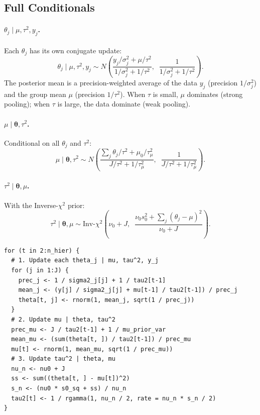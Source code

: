 \documentclass[11pt]{article}
\begin{document}
\subsection{Full Conditionals}

\paragraph{$\theta_j \mid \mu, \tau^2, y_j$.}
Each $\theta_j$ has its own conjugate update:
\[
  \theta_j \mid \mu, \tau^2, y_j \sim N\!\left(\frac{y_j/\sigma_j^2 + \mu/\tau^2}{1/\sigma_j^2 + 1/\tau^2}, \;\; \frac{1}{1/\sigma_j^2 + 1/\tau^2}\right).
\]
The posterior mean is a precision-weighted average of the data $y_j$ (precision $1/\sigma_j^2$) and the group mean $\mu$ (precision $1/\tau^2$).  When $\tau$ is small, $\mu$ dominates (strong pooling); when $\tau$ is large, the data dominate (weak pooling).

\paragraph{$\mu \mid \boldsymbol{\theta}, \tau^2$.}
Conditional on all $\theta_j$ and $\tau^2$:
\[
  \mu \mid \boldsymbol{\theta}, \tau^2 \sim N\!\left(\frac{\sum_j \theta_j / \tau^2 + \mu_0/\tau_{\mu}^2}{J/\tau^2 + 1/\tau_{\mu}^2}, \;\; \frac{1}{J/\tau^2 + 1/\tau_{\mu}^2}\right).
\]

\paragraph{$\tau^2 \mid \boldsymbol{\theta}, \mu$.}
With the Inverse-$\chi^2$ prior:
\[
  \tau^2 \mid \boldsymbol{\theta}, \mu \sim \text{Inv-}\chi^2\!\left(\nu_0 + J, \;\; \frac{\nu_0 s_0^2 + \sum_j (\theta_j - \mu)^2}{\nu_0 + J}\right).
\]

\begin{lstlisting}
for (t in 2:n_hier) {
  # 1. Update each theta_j | mu, tau^2, y_j
  for (j in 1:J) {
    prec_j <- 1 / sigma2_j[j] + 1 / tau2[t-1]
    mean_j <- (y[j] / sigma2_j[j] + mu[t-1] / tau2[t-1]) / prec_j
    theta[t, j] <- rnorm(1, mean_j, sqrt(1 / prec_j))
  }
  # 2. Update mu | theta, tau^2
  prec_mu <- J / tau2[t-1] + 1 / mu_prior_var
  mean_mu <- (sum(theta[t, ]) / tau2[t-1]) / prec_mu
  mu[t] <- rnorm(1, mean_mu, sqrt(1 / prec_mu))
  # 3. Update tau^2 | theta, mu
  nu_n <- nu0 + J
  ss <- sum((theta[t, ] - mu[t])^2)
  s_n <- (nu0 * s0_sq + ss) / nu_n
  tau2[t] <- 1 / rgamma(1, nu_n / 2, rate = nu_n * s_n / 2)
}
\end{lstlisting}
\end{document}
